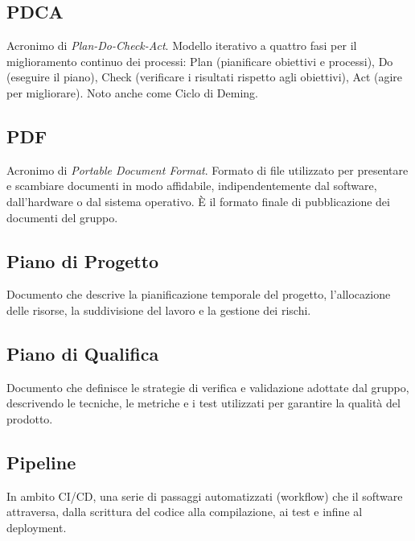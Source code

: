 \documentclass[a4paper, 11pt, oneside]{scrartcl} %
\begin{document}
\subsection*{PDCA}
Acronimo di \textit{Plan-Do-Check-Act}. Modello iterativo a quattro fasi per il miglioramento continuo dei processi: Plan (pianificare obiettivi e processi), Do (eseguire il piano), Check (verificare i risultati rispetto agli obiettivi), Act (agire per migliorare). Noto anche come Ciclo di Deming.
\vspace{0.5cm}

\subsection*{PDF}
Acronimo di \textit{Portable Document Format}. Formato di file utilizzato per presentare e scambiare documenti in modo affidabile, indipendentemente dal software, dall'hardware o dal sistema operativo. È il formato finale di pubblicazione dei documenti del gruppo.
\vspace{0.5cm}

\subsection*{Piano di Progetto}


Documento che descrive la pianificazione temporale del progetto, l'allocazione delle risorse, la suddivisione del lavoro e la gestione dei rischi.

\vspace{0.5cm}

\subsection*{Piano di Qualifica}


Documento che definisce le strategie di verifica e validazione adottate dal gruppo, descrivendo le tecniche, le metriche e i test utilizzati per garantire la qualità del prodotto.

\vspace{0.5cm}

\subsection*{Pipeline}
In ambito CI/CD, una serie di passaggi automatizzati (workflow) che il software attraversa, dalla scrittura del codice alla compilazione, ai test e infine al deployment.
\vspace{0.5cm}
\end{document}
